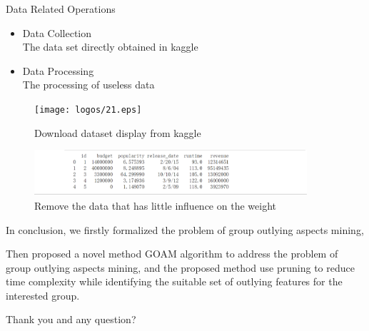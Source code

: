 \documentclass[
 size=14pt,
 paper=smartboard,  %
 mode=present, 		%
 display=slides, 	%
 style=tuliplab,  	%
 pauseslide,
 fleqn,leqno]{powerdot}
\begin{document}




\begin{slide}[toc=,bm=]{ Data Related Operations}
\begin{itemize}
\item Data Collection
\\The data set directly obtained in kaggle    
\item 
Data Processing
\\The processing of useless data

\end{itemize}
\begin{figure}[htbp]
  \centering
  \begin{minipage}[t]{0.48\textwidth}
    \centering
    \texttt{[image: logos/21.eps]}
    \vspace{0.4em}
    \caption{Download dataset display from kaggle}
  \end{minipage}
  \begin{minipage}[t]{0.48\textwidth}
    \centering
    \includegraphics[width=0.9\textwidth]{logos/24.eps}
    \vspace{0.4em}
    \caption{Remove the data that has little influence on the weight}
  \end{minipage}
\end{figure}
\begin{note}
In conclusion,
we firstly formalized the problem of
group outlying aspects mining,

Then proposed a novel method GOAM algorithm to address the problem of
group outlying aspects mining,
and the proposed method use pruning to reduce time complexity
while identifying the suitable set of outlying features for the interested group.

Thank you and any question?
\end{note}

\end{slide}
\end{document}
